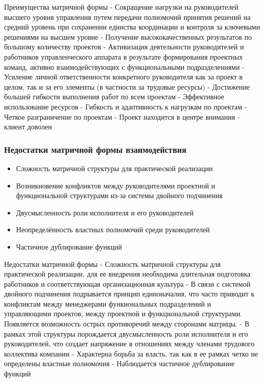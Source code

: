 \documentclass{../industrial-development}
\begin{document}
\lecturenotes
Преимущества матричной формы
- Сокращение нагрузки на руководителей высшего уровня управления путем передачи полномочий принятия решений на средний уровень при сохранении единства координации и контроля за ключевыми решениями на высшем уровне
- Получение высококачественных результатов по большому количеству проектов
- Активизация деятельности руководителей и работников управленческого аппарата в результате формирования проектных команд, активно взаимодействующих с функциональными подразделениями
- Усиление личной ответственности конкретного руководителя как за проект в целом, так и за его элементы (в частности за трудовые ресурсы)
- Достижение большей гибкости выполнения работ по всем проектам
- Эффективное использование ресурсов
- Гибкость и адаптивность к нагрузкам по проектам
- Четкое разграничение по проектам
- Проект находится в центре внимания - клиент доволен

\begin{frame} \frametitle{Недостатки матричной формы взаимодействия}
  
  \begin{itemize}
  \item Сложность матричной структуры для практической реализации
  \item Возникновение конфликтов между руководителями проектной и функциональной структурами из-за системы двойного подчинения
  \item Двусмысленность роли исполнителя и его руководителей
  \item Неопределённость властных полномочий среди руководителей
  \item Частичное дублирование функций
\end{itemize}
\end{frame}

\lecturenotes
Недостатки матричной формы
- Сложность матричной структуры для практической реализации, для ее внедрения необходима длительная подготовка работников и соответствующая организационная культура
- В связи с системой двойного подчинения подрывается принцип единоначалия, что часто приводит к конфликтам между менеджерами функиональных подразделений и управляющими проектов, между проектной и функциональной структурами. Появляется возможность острых противоречий между сторонами матрицы.
- В рамках этой структуры порождается двусмысленность роли исполнителя и его руководителей, что создает напряжение в отношениях между членами трудового коллектива компании
- Характерна борьба за власть, так как в ее рамках четко не определены властные полномочия
- Наблюдается частичное дублирование функций
\end{document}
